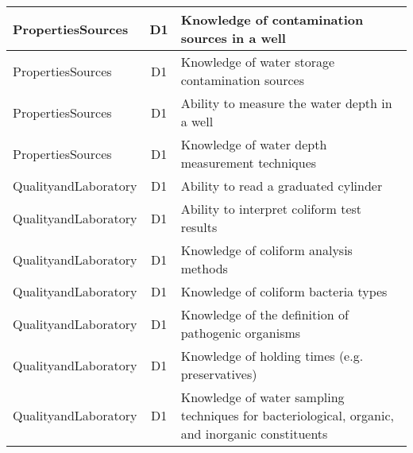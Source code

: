 \documentclass{article}
\begin{document}
\begin{table}[]
\begin{tabular}{|l|c|l|}
PropertiesSources                      & D1             & Knowledge of   contamination sources in a well                                                                                    \\ \hline
PropertiesSources                      & D1             & Knowledge of water   storage contamination sources                                                                                \\ \hline
PropertiesSources                      & D1             & Ability to measure   the water depth in a well                                                                                    \\ \hline
PropertiesSources                      & D1             & Knowledge of water   depth measurement techniques                                                                                 \\ \hline
QualityandLaboratory                   & D1             & Ability to read a   graduated cylinder                                                                                            \\ \hline
QualityandLaboratory                   & D1             & Ability to interpret   coliform test results                                                                                      \\ \hline
QualityandLaboratory                   & D1             & Knowledge of coliform   analysis methods                                                                                          \\ \hline
QualityandLaboratory                   & D1             & Knowledge of coliform   bacteria types                                                                                            \\ \hline
QualityandLaboratory                   & D1             & Knowledge of the   definition of pathogenic organisms                                                                             \\ \hline
QualityandLaboratory                   & D1             & Knowledge of holding   times (e.g. preservatives)                                                                                 \\ \hline
QualityandLaboratory                   & D1             & Knowledge of water   sampling techniques for bacteriological, organic, and inorganic constituents                                 \\ \hline

\end{tabular}
\end{table}
\end{document}
